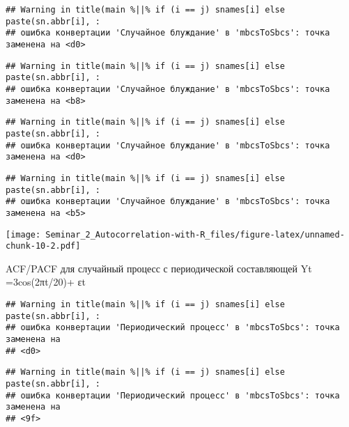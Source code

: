 \documentclass[
]{article}
\newenvironment{Shaded}{\begin{snugshade}}{\end{snugshade}}
\newcommand{\AttributeTok}[1]{\textcolor[rgb]{0.13,0.29,0.53}{#1}}
\newcommand{\DecValTok}[1]{\textcolor[rgb]{0.00,0.00,0.81}{#1}}
\newcommand{\FunctionTok}[1]{\textcolor[rgb]{0.13,0.29,0.53}{\textbf{#1}}}
\newcommand{\NormalTok}[1]{#1}
\newcommand{\SpecialCharTok}[1]{\textcolor[rgb]{0.81,0.36,0.00}{\textbf{#1}}}
\newcommand{\StringTok}[1]{\textcolor[rgb]{0.31,0.60,0.02}{#1}}
\begin{document}
\begin{verbatim}
## Warning in title(main %||% if (i == j) snames[i] else paste(sn.abbr[i], :
## ошибка конвертации 'Случайное блуждание' в 'mbcsToSbcs': точка заменена на <d0>
\end{verbatim}

\begin{verbatim}
## Warning in title(main %||% if (i == j) snames[i] else paste(sn.abbr[i], :
## ошибка конвертации 'Случайное блуждание' в 'mbcsToSbcs': точка заменена на <b8>
\end{verbatim}

\begin{verbatim}
## Warning in title(main %||% if (i == j) snames[i] else paste(sn.abbr[i], :
## ошибка конвертации 'Случайное блуждание' в 'mbcsToSbcs': точка заменена на <d0>
\end{verbatim}

\begin{verbatim}
## Warning in title(main %||% if (i == j) snames[i] else paste(sn.abbr[i], :
## ошибка конвертации 'Случайное блуждание' в 'mbcsToSbcs': точка заменена на <b5>
\end{verbatim}

\texttt{[image: Seminar\_2\_Autocorrelation-with-R\_files/figure-latex/unnamed-chunk-10-2.pdf]}

ACF/PACF для случайный процесс с периодической составляющей Yt
=3cos(2πt/20)+ εt

\begin{Shaded}
\end{Shaded}

\begin{verbatim}
## Warning in title(main %||% if (i == j) snames[i] else paste(sn.abbr[i], :
## ошибка конвертации 'Периодический процесс' в 'mbcsToSbcs': точка заменена на
## <d0>
\end{verbatim}

\begin{verbatim}
## Warning in title(main %||% if (i == j) snames[i] else paste(sn.abbr[i], :
## ошибка конвертации 'Периодический процесс' в 'mbcsToSbcs': точка заменена на
## <9f>
\end{verbatim}
\end{document}

